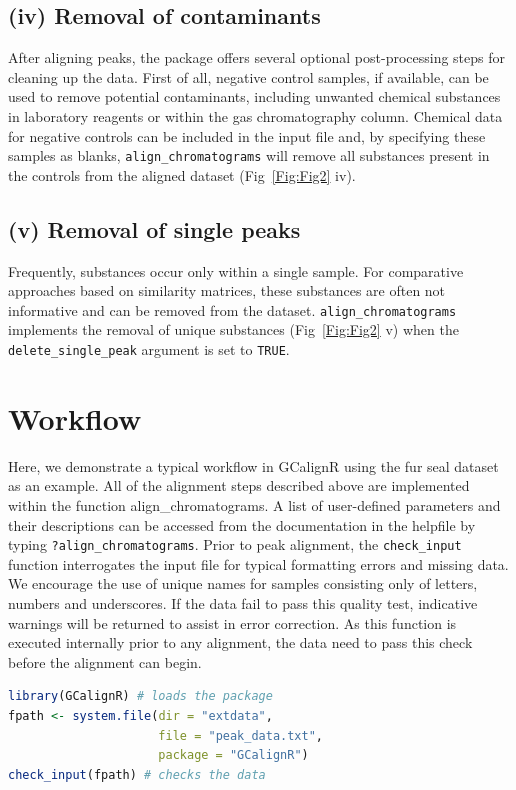 \documentclass[10pt,letterpaper]{article}
\begin{document}
\subsection*{(iv) Removal of contaminants}
After aligning peaks, the package offers several optional post-processing steps for cleaning up the data. First of all, negative control samples, if available, can be used to remove potential contaminants, including unwanted chemical substances in laboratory reagents or within the gas chromatography column. Chemical data for negative controls can be included in the input file and, by specifying these samples as blanks, \texttt{align\_chromatograms} will remove all substances present in the controls from the aligned dataset (Fig~\ref{Fig:Fig2} iv).

\subsection*{(v) Removal of single peaks}
Frequently, substances occur only within a single sample. For comparative approaches based on similarity matrices, these substances are often not informative and can be removed from the dataset. \texttt{align\_chromatograms} implements the removal of unique substances (Fig~\ref{Fig:Fig2} v) when the \texttt{delete\_single\_peak} argument is set to \texttt{TRUE}.

\section*{Workflow}
Here, we demonstrate a typical workflow in GCalignR using the fur seal dataset as an example. All of the alignment steps described above are implemented within the function align\_chromatograms. A list of user-defined parameters and their descriptions can be accessed from the documentation in the helpfile by typing \texttt{?align\_chromatograms}. Prior to peak alignment, the \texttt{check\_input} function interrogates the input file for typical formatting errors and missing data. We encourage the use of unique names for samples consisting only of letters, numbers and underscores. If the data fail to pass this quality test, indicative warnings will be returned to assist in error correction. As this function is executed internally prior to any alignment, the data need to pass this check before the alignment can begin.


\begin{lstlisting}[language=R]
library(GCalignR) # loads the package 
fpath <- system.file(dir = "extdata",
                     file = "peak_data.txt",
                     package = "GCalignR")
check_input(fpath) # checks the data
\end{lstlisting}
\end{document}
